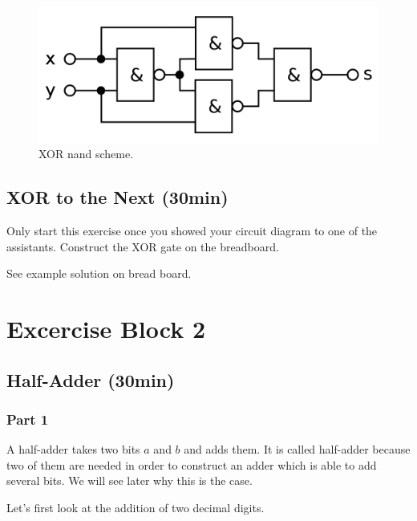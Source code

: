 \documentclass[10pt,a4paper]{article}
\begin{document}
\begin{enumerate}
\begin{figure}[H]
			\centering		  
			\includegraphics[scale=0.3]{xor-nand-scheme}
			\caption{XOR nand scheme.}
			\label{fig:xor-nand-scheme}
		\end{figure}
	\end{enumerate}
	
	\subsection{XOR to the Next (30min)}
	Only start this exercise once you showed your circuit diagram to one of the assistants.
	Construct the XOR gate on the breadboard.
	\begin{center}
		See example solution on bread board.
	\end{center}
	\section{Excercise Block 2}
	
	\subsection{Half-Adder (30min)}
	\subsubsection{Part 1}
	A half-adder takes two bits $a$ and $b$ and adds them. It is called half-adder because two of them are needed in order to construct an adder which is able to add several bits. We will see later why this is the case.
	
	Let's first look at the addition of two decimal digits. 
	
\end{document}
